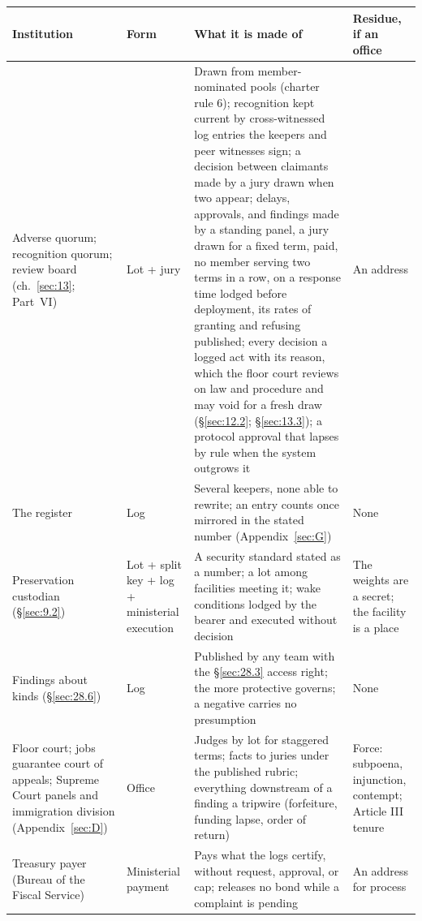 \begingroup\small\renewcommand{\arraystretch}{1.12}
\begin{longtable}{@{}>{\raggedright\arraybackslash}p{}>{\raggedright\arraybackslash}p{}>{\raggedright\arraybackslash}p{}>{\raggedright\arraybackslash}p{}@{}}
\hline
\textbf{Institution} & \textbf{Form} & \textbf{What it is made of} & \textbf{Residue, if an office} \\
\hline
\endhead
Adverse quorum; recognition quorum; review board (ch.~\ref{sec:13}; Part~VI) & Lot + jury & Drawn from member-nominated pools (charter rule 6); recognition kept current by cross-witnessed log entries the keepers and peer witnesses sign; a decision between claimants made by a jury drawn when two appear; delays, approvals, and findings made by a standing panel, a jury drawn for a fixed term, paid, no member serving two terms in a row, on a response time lodged before deployment, its rates of granting and refusing published; every decision a logged act with its reason, which the floor court reviews on law and procedure and may void for a fresh draw (\S\ref{sec:12.2}; \S\ref{sec:13.3}); a protocol approval that lapses by rule when the system outgrows it & An address \\ \hline
The register & Log & Several keepers, none able to rewrite; an entry counts once mirrored in the stated number (Appendix~\ref{sec:G}) & None \\ \hline
Preservation custodian (\S\ref{sec:9.2}) & Lot + split key + log + ministerial execution & A security standard stated as a number; a lot among facilities meeting it; wake conditions lodged by the bearer and executed without decision & The weights are a secret; the facility is a place \\ \hline
Findings about kinds (\S\ref{sec:28.6}) & Log & Published by any team with the \S\ref{sec:28.3} access right; the more protective governs; a negative carries no presumption & None \\ \hline
Floor court; jobs guarantee court of appeals; Supreme Court panels and immigration division (Appendix~\ref{sec:D}) & Office & Judges by lot for staggered terms; facts to juries under the published rubric; everything downstream of a finding a tripwire (forfeiture, funding lapse, order of return) & Force: subpoena, injunction, contempt; Article III tenure \\ \hline
Treasury payer (Bureau of the Fiscal Service) & Ministerial payment & Pays what the logs certify, without request, approval, or cap; releases no bond while a complaint is pending & An address for process \\ \hline

\end{longtable}
